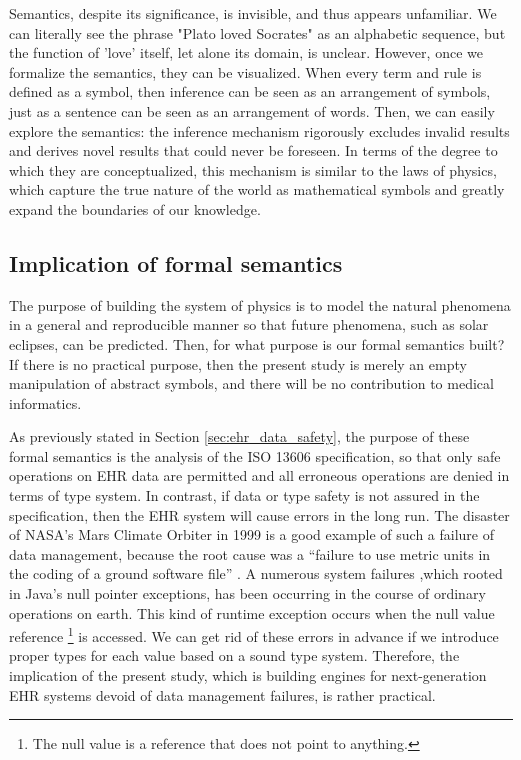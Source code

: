 \documentclass[preprint,3p,onecolumn,times,review]{article}
\begin{document}
{Semantics, despite its significance, is invisible, and thus appears unfamiliar. We can literally see the phrase "Plato loved Socrates" as an alphabetic sequence, but the function of 'love' itself, let alone its domain, is unclear. However, once we formalize the semantics, they can be visualized. When every term and rule is defined as a symbol, then inference can be seen as an arrangement of symbols, just as a sentence can be seen as an arrangement of words. Then, we can easily explore the semantics: the inference mechanism rigorously excludes invalid results and derives novel results that could never be foreseen. In terms of the degree to which they are conceptualized, this mechanism is similar to the laws of physics, which capture the true nature of the world as mathematical symbols and greatly expand the boundaries of our knowledge.

\subsection{Implication of  formal semantics}


The purpose of building the system of physics is to model the natural phenomena in a general and reproducible manner so that future phenomena, such as solar eclipses, can be predicted.
Then, for what purpose is our formal semantics built?
If there is no practical purpose, then the present study is merely an empty manipulation of abstract symbols, and there will be no contribution to medical informatics.

As previously stated in Section {\ref{sec:ehr_data_safety}}, the purpose of these formal semantics is the analysis of the ISO 13606 specification, so that only safe operations on EHR data are permitted and all erroneous operations are denied in terms of type system.  
In contrast, if data or type safety is not assured in the specification, then the EHR system will cause errors in the long run.
The disaster of NASA's Mars Climate Orbiter in 1999 is a good example of such a failure of data management, because the root cause was a ``failure to use metric units in the coding of a ground software file'' {\cite{stephenson99:_mars_climat_orbit_mishap_inves_board}}.
A numerous system failures ,which rooted in Java's null pointer exceptions, has been occurring in the course of ordinary operations on earth.
This kind of runtime exception occurs when the null value reference {\footnote{The null value is a reference that does not point to anything.}} is accessed.
We can get rid of these errors in advance if we introduce proper types for each value based on a sound type system.
Therefore, the implication of the present study, which is building engines for next-generation EHR systems devoid of data management failures, is rather practical.


}
\end{document}
